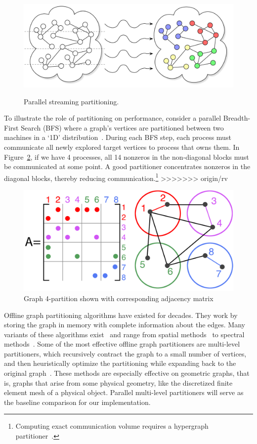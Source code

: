 \begin{figure}[ht]
\centering
  \includegraphics[width=0.7\columnwidth]{figures/coverfig.pdf}
  \label{fig:coverfig}
  \caption{Parallel streaming partitioning.}
\end{figure}

To illustrate the role of partitioning on performance, consider a parallel Breadth-First Search (BFS) where a graph's vertices are partitioned between two machines in a `1D' distribution~\cite{Buluc2D}. During each BFS step, each process must communicate all newly explored target vertices to process that owns them. In Figure~\ref{fig:0}, if we have 4 processes, all 14 nonzeros in the non-diagonal blocks must be communicated at some point. A good partitioner concentrates nonzeros in the diagonal blocks, thereby reducing communication.\footnote{Computing exact communication volume requires a hypergraph partitioner~\cite{hypergraph}.} 
>>>>>>> origin/rv

\begin{figure}[h]
\centering
\includegraphics[width=0.85\columnwidth] {figures/graphpart1.pdf}
\caption[Caption for]{Graph 4-partition shown with corresponding adjacency matrix}
\label{fig:0}
\end{figure}

Offline graph partitioning algorithms have existed for dec\-ades. They work by storing the graph in memory with complete information about the edges. Many variants of these algorithms exist~\cite{gpsurvey} and range from spatial methods~\cite{Gilbert95geometricmesh} to spectral methods~\cite{arora2009expander}. Some of the most effective offline graph partitioners are multi-level partitioners, which recursively contract the graph to a small number of vertices, and then heuristically optimize the partitioning while expanding back to the original graph~\cite{karypis1998multilevel}.
These methods are especially effective on geometric graphs, that is, graphs that arise from some physical geometry, like the discretized finite element mesh of a physical object.
Parallel multi-level partitioners will serve as the baseline comparison for our implementation. 

